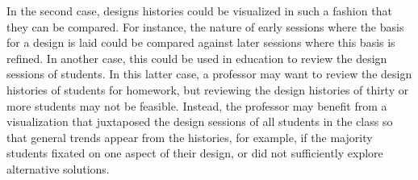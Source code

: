 In the second case, designs histories could be visualized in such a fashion that they can be compared. For instance, the nature of early sessions where the basis for a design is laid could be compared against later sessions where this basis is refined. In another case, this could be used in education to review the design sessions of students. In this latter case, a professor may want to review the design histories of students for homework, but reviewing the design histories of thirty or more students may not be feasible. Instead, the professor may benefit from a visualization that juxtaposed the design sessions of all students in the class so that general trends appear from the histories, for example, if the majority students fixated on one aspect of their design, or did not sufficiently explore alternative solutions.

